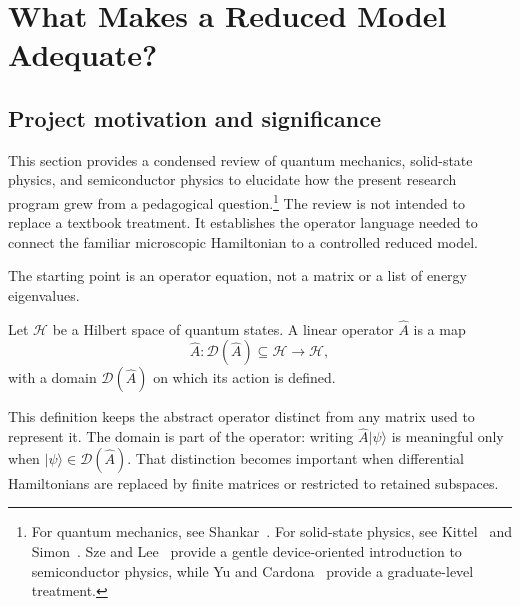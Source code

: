 \chapter{What Makes a Reduced Model Adequate?}

\label{ch:operator-reduction-motivation}


\section{Project motivation and significance}

This section provides a condensed review of quantum mechanics, solid-state
physics, and semiconductor physics to elucidate how the present research
program grew from a pedagogical question.\footnote{For quantum mechanics, see
Shankar~\cite{shankar1994}. For solid-state physics, see
Kittel~\cite{kittel2004} and Simon~\cite{simon2013}. Sze and
Lee~\cite{szeLee2012} provide a gentle device-oriented introduction to
semiconductor physics, while Yu and Cardona~\cite{yuCardona2010} provide a
graduate-level treatment.} The review is not intended to replace a textbook
treatment. It establishes the operator language needed to connect
the familiar microscopic Hamiltonian to a controlled reduced model.

The starting point is an operator equation, not a matrix or a list of energy
eigenvalues.

\begin{definition}

Let $\mathcal H$ be a Hilbert space of quantum states. A linear operator
$\hat A$ is a map
\begin{equation}
    \hat A:\mathcal D(\hat A)\subseteq\mathcal H\longrightarrow\mathcal H,
\end{equation}
with a domain $\mathcal D(\hat A)$ on which its action is defined.
\end{definition}

This definition keeps the abstract operator distinct from any matrix used to
represent it. The domain is part of the operator: writing
$\hat A\lvert\psi\rangle$ is meaningful only when
$\lvert\psi\rangle\in\mathcal D(\hat A)$. That distinction becomes important
when differential Hamiltonians are replaced by finite matrices or restricted
to retained subspaces.

